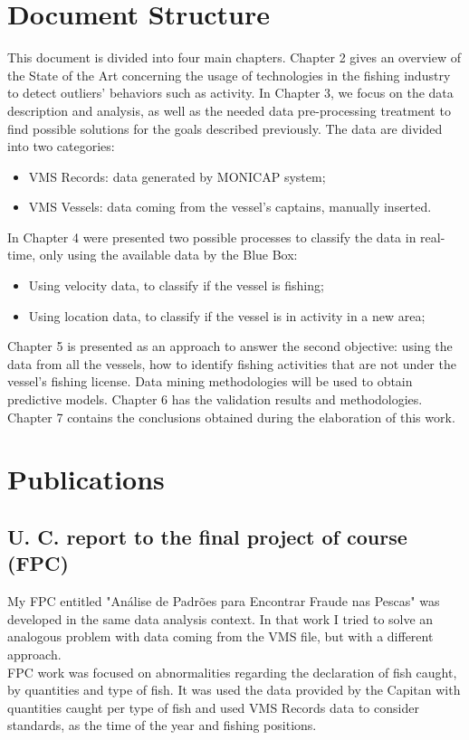 \section{Document Structure} %
\label{sec:work_structure}
This document is divided into four main chapters. Chapter 2 gives an overview of the State of the Art concerning the usage of technologies in the fishing industry to detect outliers' behaviors such as activity. In Chapter 3, we focus on the data description and analysis, as well as the needed data pre-processing treatment to find possible solutions for the goals described previously. The data are divided into two categories:
\begin{itemize}
\item VMS Records: data generated by MONICAP system;
\item VMS Vessels: data coming from the vessel's captains, manually inserted.
\end{itemize}
In Chapter 4 were presented two possible processes to classify the data in real-time, only using the available data by the Blue Box:
\begin{itemize}
\item Using velocity data, to classify if the vessel is fishing;
\item Using location data, to classify if the vessel is in activity in a new area;
\end{itemize}
Chapter 5 is presented as an approach to answer the second objective: using the data from all the vessels, how to identify fishing activities that are not under the vessel's fishing license. Data mining methodologies will be used to obtain predictive models.
Chapter 6 has the validation results and methodologies.
Chapter 7 contains the conclusions obtained during the elaboration of this work.


\section{Publications} %
\label{sec:publications}

\subsection{U. C. report to the final project of course (FPC)} %
\label{sub:fpc}
My FPC entitled "Análise de Padrões para Encontrar Fraude nas Pescas" was developed in the same data analysis context. In that work I tried to solve an analogous problem with data coming from the VMS file, but with a different approach.\\
FPC work was focused on abnormalities regarding the declaration of fish caught, by quantities and type of fish. It was used the data provided by the Capitan with quantities caught per type of fish and used VMS Records data to consider standards, as the time of the year and fishing positions.

